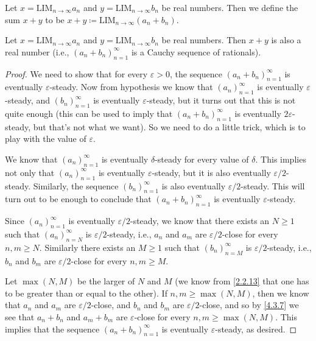 \begin{definition}\label{5.3.4}
  Let \(x = \text{LIM}_{n \to \infty} a_n\) and \(y = \text{LIM}_{n \to \infty} b_n\) be real numbers.
  Then we define the sum \(x + y\) to be \(x + y \coloneqq \text{LIM}_{n \to \infty} (a_n + b_n)\).
\end{definition}

\setcounter{theorem}{5}
\begin{lemma}\label{5.3.6}
  Let \(x = \text{LIM}_{n \to \infty} a_n\) and \(y = \text{LIM}_{n \to \infty} b_n\) be real numbers.
  Then \(x + y\) is also a real number
  (i.e., \((a_n + b_n)_{n = 1}^{\infty}\) is a Cauchy sequence of rationals).
\end{lemma}

\begin{proof}
  We need to show that for every \(\varepsilon > 0\), the sequence \((a_n + b_n)_{n = 1}^{\infty}\) is eventually \(\varepsilon\)-steady.
  Now from hypothesis we know that \((a_n)_{n = 1}^{\infty}\) is eventually \(\varepsilon\)-steady, and \((b_n)_{n = 1}^{\infty}\) is eventually \(\varepsilon\)-steady, but it turns out that this is not quite enough
  (this can be used to imply that \((a_n + b_n)_{n = 1}^{\infty}\) is eventually \(2\varepsilon\)-steady, but that's not what we want).
  So we need to do a little trick, which is to play with the value of \(\varepsilon\).

  We know that \((a_n)_{n = 1}^{\infty}\) is eventually \(\delta\)-steady for every value of \(\delta\).
  This implies not only that \((a_n)_{n = 1}^{\infty}\) is eventually \(\varepsilon\)-steady, but it is also eventually \(\varepsilon / 2\)-steady.
  Similarly, the sequence \((b_n)_{n = 1}^{\infty}\) is also eventually \(\varepsilon / 2\)-steady.
  This will turn out to be enough to conclude that \((a_n + b_n)_{n = 1}^{\infty}\) is eventually \(\varepsilon\)-steady.

  Since \((a_n)_{n = 1}^{\infty}\) is eventually \(\varepsilon / 2\)-steady, we know that there exists an \(N \geq 1\) such that \((a_n)_{n = N}^{\infty}\) is \(\varepsilon / 2\)-steady, i.e., \(a_n\) and \(a_m\) are \(\varepsilon / 2\)-close for every \(n, m \geq N\).
  Similarly there exists an \(M \geq 1\) such that \((b_n)_{n = M}^{\infty}\) is \(\varepsilon / 2\)-steady, i.e., \(b_n\) and \(b_m\) are \(\varepsilon / 2\)-close for every \(n, m \geq M\).

  Let \(\max(N, M)\) be the larger of \(N\) and \(M\)
  (we know from \cref{2.2.13} that one has to be greater than or equal to the other).
  If \(n, m \geq \max(N, M)\), then we know that \(a_n\) and \(a_m\) are \(\varepsilon / 2\)-close, and \(b_n\) and \(b_m\) are \(\varepsilon / 2\)-close, and so by \cref{4.3.7} we see that \(a_n + b_n\) and \(a_m + b_m\) are \(\varepsilon\)-close for every \(n, m \geq \max(N, M)\).
  This implies that the sequence \((a_n + b_n)_{n = 1}^{\infty}\) is eventually \(\varepsilon\)-steady, as desired.
\end{proof}

